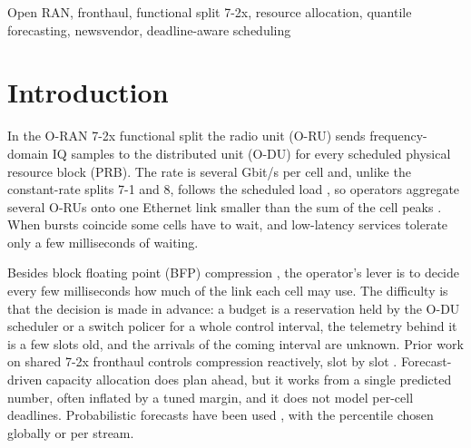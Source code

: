 \documentclass[conference]{IEEEtran}
\begin{document}
\begin{IEEEkeywords}
Open RAN, fronthaul, functional split 7-2x, resource allocation, quantile forecasting, newsvendor, deadline-aware scheduling
\end{IEEEkeywords}

\section{Introduction}
\label{sec:intro}

In the O-RAN 7-2x functional split \cite{oran_cus,polese2023} the radio unit (O-RU) sends frequency-domain IQ samples to the distributed unit (O-DU) for every scheduled physical resource block (PRB). The rate is several Gbit/s per cell and, unlike the constant-rate splits 7-1 and 8, follows the scheduled load \cite{larsen2019}, so operators aggregate several O-RUs onto one Ethernet link smaller than the sum of the cell peaks \cite{perez2018,wang2017}. When bursts coincide some cells have to wait, and low-latency services tolerate only a few milliseconds of waiting.

Besides block floating point (BFP) compression \cite{oran_cus}, the operator's lever is to decide every few milliseconds how much of the link each cell may use. The difficulty is that the decision is made in advance: a budget is a reservation held by the O-DU scheduler or a switch policer for a whole control interval, the telemetry behind it is a few slots old, and the arrivals of the coming interval are unknown. Prior work on shared 7-2x fronthaul controls compression reactively, slot by slot \cite{lagen2022}. Forecast-driven capacity allocation \cite{bega2019,bega2020,sciancalepore2017,kavehmadavani2023} does plan ahead, but it works from a single predicted number, often inflated by a tuned margin, and it does not model per-cell deadlines. Probabilistic forecasts have been used \cite{kasuluru2024,cohen2023}, with the percentile chosen globally or per stream.
\end{document}
